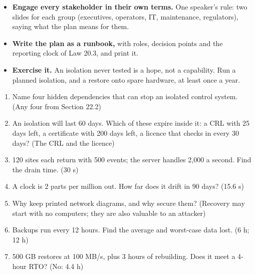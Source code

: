 \begin{itemize}
\item \textbf{Engage every stakeholder in their own terms.} One speaker's rule: two slides for each group (executives, operators, IT, maintenance, regulators), saying what the plan means for them.
\item \textbf{Write the plan as a runbook,} with roles, decision points and the reporting clock of Law 20.3, and print it.
\item \textbf{Exercise it.} An isolation never tested is a hope, not a capability. Run a planned isolation, and a restore onto spare hardware, at least once a year.
\end{itemize}


\begin{enumerate}
\item Name four hidden dependencies that can stop an isolated control system. (Any four from Section 22.2)
\item An isolation will last 60 days. Which of these expire inside it: a CRL with 25 days left, a certificate with 200 days left, a licence that checks in every 30 days? (The CRL and the licence)
\item 120 sites each return with 500 events; the server handles 2,000 a second. Find the drain time. (30 s)
\item A clock is 2 parts per million out. How far does it drift in 90 days? (15.6 s)
\item Why keep printed network diagrams, and why secure them? (Recovery may start with no computers; they are also valuable to an attacker)
\item Backups run every 12 hours. Find the average and worst-case data lost. (6 h; 12 h)
\item 500 GB restores at 100 MB/s, plus 3 hours of rebuilding. Does it meet a 4-hour RTO? (No: 4.4 h)
\end{enumerate}
